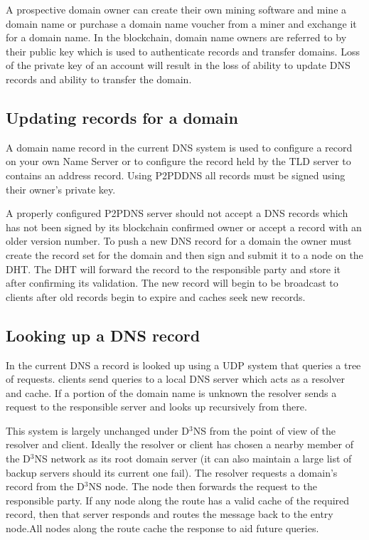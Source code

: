 \documentclass[11pt]{IEEEtran} %
\begin{document}
A prospective domain owner can create their own mining software and mine a domain name or purchase a domain name voucher from a miner and exchange it for a domain name. In the blockchain, domain name owners are referred to by their public key which is used to authenticate records and transfer domains. Loss of the private key of an account will result in the loss of ability to update DNS records and ability to transfer the domain. 


\subsection{Updating records for a domain}
A domain name record in the current DNS system is used to configure a record on your own Name Server or to configure the record held by the TLD server to contains an address record. Using P2PDDNS all records must be signed using their owner's private key. 

A properly configured P2PDNS server should not accept a DNS records which has not been signed by its blockchain confirmed owner or accept a record with an older version number. To push a new DNS record for a domain the owner must create the record set for the domain and then sign and submit it to a node on the DHT. The DHT will forward the record to the responsible party and store it after confirming its validation. The new record will begin to be broadcast to clients after old records begin to expire and caches seek new records.

\subsection{Looking up a DNS record}
In the current DNS a record is looked up using a UDP system that queries a tree of requests. clients send queries to  a local DNS server which acts as a resolver and cache. If a portion of the domain name is unknown the resolver sends a request to the responsible server and looks up recursively from there.

This system is largely unchanged under D$^{3}$NS from the point of view of the resolver and client. Ideally the resolver or client has chosen a nearby member of the D$^{3}$NS network as its root domain server (it can also maintain a large list of backup servers should its current one fail). The resolver requests a domain's record from the D$^{3}$NS node. The node then forwards the request to the responsible party. If any node along the route has a valid cache of the required record, then that server responds and routes the message back to the entry node.All nodes along the route cache the response to aid future queries.
\end{document}
